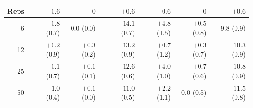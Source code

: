 \begin{tabular}{rrrrrrr}
\toprule
Reps & $-0.6$ & $0$ & $+0.6$ & $-0.6$ & $0$ & $+0.6$ \\
\midrule
6 & $-0.8$ (0.7) & $0.0$ (0.0) & $-14.1$ (0.7) & $+4.8$ (1.5) & $+0.5$ (0.8) & $-9.8$ (0.9) \\
12 & $+0.2$ (0.9) & $+0.3$ (0.2) & $-13.2$ (0.9) & $+0.7$ (1.2) & $+0.3$ (0.7) & $-10.3$ (0.9) \\
25 & $-0.1$ (0.7) & $+0.1$ (0.1) & $-12.6$ (0.6) & $+4.0$ (1.0) & $+0.7$ (0.6) & $-10.8$ (0.9) \\
50 & $-1.0$ (0.4) & $+0.1$ (0.0) & $-11.0$ (0.5) & $+2.2$ (1.1) & $0.0$ (0.5) & $-11.5$ (0.8) \\
\bottomrule
\end{tabular}
